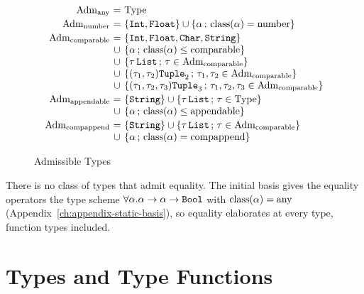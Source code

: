 \begin{figure}[ht]
\centering
\[
\begin{array}{@{}r@{\ }c@{\ }l@{}}
  \Adm{\kany} & = & \Type\\[2pt]
  \Adm{\knum} & = & \{\tInt, \tFloat\} \cup \{\alpha \,;\, \clsof(\alpha) = \knum\}\\[2pt]
  \Adm{\kcomp} & = & \{\tInt, \tFloat, \tChar, \tString\}\\
  & \cup & \{\alpha \,;\, \clsof(\alpha) \leq \kcomp\}\\
  & \cup & \{\tau\,\tList \,;\, \tau \in \Adm{\kcomp}\}\\
  & \cup & \{(\tau_1, \tau_2)\tTuple{2} \,;\, \tau_1, \tau_2 \in \Adm{\kcomp}\}\\
  & \cup & \{(\tau_1, \tau_2, \tau_3)\tTuple{3} \,;\, \tau_1, \tau_2, \tau_3 \in \Adm{\kcomp}\}\\[2pt]
  \Adm{\kapp} & = & \{\tString\} \cup \{\tau\,\tList \,;\, \tau \in \Type\}\\
  & \cup & \{\alpha \,;\, \clsof(\alpha) \leq \kapp\}\\[2pt]
  \Adm{\kcapp} & = & \{\tString\} \cup \{\tau\,\tList \,;\, \tau \in \Adm{\kcomp}\}\\
  & \cup & \{\alpha \,;\, \clsof(\alpha) = \kcapp\}
\end{array}
\]
\caption{Admissible Types}\label{fig:static-core-admissible}
\end{figure}

There is no class of types that admit equality. The initial basis gives the
equality operators the type scheme $\forall\alpha.\alpha \rightarrow \alpha
\rightarrow \mathtt{Bool}$ with $\mathrm{class}(\alpha) = \mathrm{any}$
(Appendix~\ref{ch:appendix-static-basis}), so equality elaborates at every
type, function types included. %

\section{Types and Type Functions}\label{sec:static-core-types}

